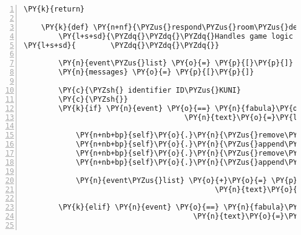 \begin{Verbatim}[commandchars=\\\{\},numbers=left,firstnumber=1,stepnumber=1]
        \PY{k}{return}

    \PY{k}{def} \PY{n+nf}{\PYZus{}respond\PYZus{}room\PYZus{}default}\PY{p}{(}\PY{n+nb+bp}{self}\PY{p}{,} \PY{n}{event}\PY{p}{,} \PY{n}{room}\PY{p}{)}\PY{p}{:}
        \PY{l+s+sd}{\PYZdq{}\PYZdq{}\PYZdq{}Handles game logic for default room.}
\PY{l+s+sd}{        \PYZdq{}\PYZdq{}\PYZdq{}}

        \PY{n}{event\PYZus{}list} \PY{o}{=} \PY{p}{[}\PY{p}{]}
        \PY{n}{messages} \PY{o}{=} \PY{p}{[}\PY{p}{]}

        \PY{c}{\PYZsh{} identifier ID\PYZus{}KUNI}
        \PY{c}{\PYZsh{}}
        \PY{k}{if} \PY{n}{event} \PY{o}{==} \PY{n}{fabula}\PY{o}{.}\PY{n}{SaysEvent}\PY{p}{(}\PY{n}{identifier}\PY{o}{=}\PY{n}{ID\PYZus{}KUNI}\PY{p}{,}
                                     \PY{n}{text}\PY{o}{=}\PY{l+s}{\PYZsq{}}\PY{l+s}{Hallo, ich bin der Gnom Kuni.}\PY{l+s}{\PYZsq{}}\PY{p}{)}\PY{p}{:}

            \PY{n+nb+bp}{self}\PY{o}{.}\PY{n}{\PYZus{}remove\PYZus{}sentence}\PY{p}{(}\PY{n}{ID\PYZus{}KUNI}\PY{p}{,} \PY{n}{event}\PY{o}{.}\PY{n}{text}\PY{p}{)}
            \PY{n+nb+bp}{self}\PY{o}{.}\PY{n}{\PYZus{}append\PYZus{}sentence}\PY{p}{(}\PY{n}{ID\PYZus{}KUNI}\PY{p}{,} \PY{l+s}{\PYZsq{}}\PY{l+s}{Es muss irgendwo einen Eingang zum alten Gnomenweg geben.}\PY{l+s}{\PYZsq{}}\PY{p}{)}
            \PY{n+nb+bp}{self}\PY{o}{.}\PY{n}{\PYZus{}remove\PYZus{}sentence}\PY{p}{(}\PY{n}{ID\PYZus{}CASSANDRA}\PY{p}{,} \PY{l+s}{\PYZsq{}}\PY{l+s}{Mit wem habe ich die Ehre?}\PY{l+s}{\PYZsq{}}\PY{p}{)}
            \PY{n+nb+bp}{self}\PY{o}{.}\PY{n}{\PYZus{}append\PYZus{}sentence}\PY{p}{(}\PY{n}{ID\PYZus{}CASSANDRA}\PY{p}{,} \PY{l+s}{\PYZsq{}}\PY{l+s}{Die Brücke, die über den Fluss in Richtung Zauberwald führt, ist kaputt.}\PY{l+s}{\PYZsq{}}\PY{p}{)}

            \PY{n}{event\PYZus{}list} \PY{o}{+}\PY{o}{=} \PY{p}{[}\PY{n}{fabula}\PY{o}{.}\PY{n}{SaysEvent}\PY{p}{(}\PY{n}{identifier}\PY{o}{=}\PY{n}{ID\PYZus{}CASSANDRA}\PY{p}{,}
                                            \PY{n}{text}\PY{o}{=}\PY{l+s}{\PYZsq{}}\PY{l+s}{Sehr erfreut!}\PY{l+s}{\PYZsq{}}\PY{p}{)}\PY{p}{]}

        \PY{k}{elif} \PY{n}{event} \PY{o}{==} \PY{n}{fabula}\PY{o}{.}\PY{n}{SaysEvent}\PY{p}{(}\PY{n}{identifier}\PY{o}{=}\PY{n}{ID\PYZus{}KUNI}\PY{p}{,}
                                       \PY{n}{text}\PY{o}{=}\PY{l+s}{\PYZsq{}}\PY{l+s}{Wer bist du?}\PY{l+s}{\PYZsq{}}\PY{p}{)}\PY{p}{:}


\end{Verbatim}
